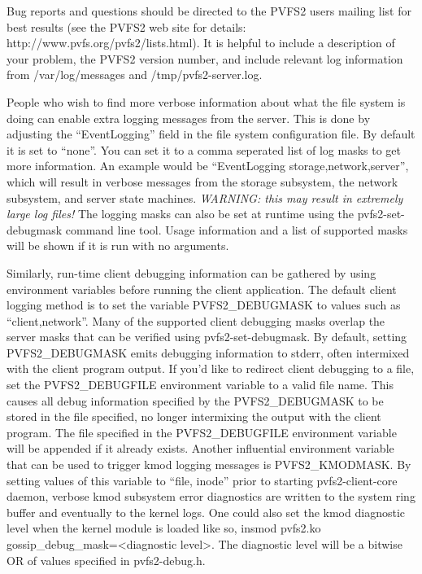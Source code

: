 \documentclass[11pt, letterpaper]{article}
\begin{document}
Bug reports and questions should be directed to the PVFS2 users
mailing list for best results (see the PVFS2 web site for details:
http://www.pvfs.org/pvfs2/lists.html).  It is helpful to include a
description of your problem, the PVFS2 version number, and include
relevant log information from /var/log/messages and
/tmp/pvfs2-server.log.

People who wish to find more verbose information about what the file
system is doing can enable extra logging messages from the server.
This is done by adjusting the ``EventLogging'' field in the file
system configuration file.  By default it is set to ``none''.  You can
set it to a comma seperated list of log masks to get more information.
An example would be ``EventLogging storage,network,server'', which
will result in verbose messages from the storage subsystem, the
network subsystem, and server state machines.  \emph{WARNING: this may
result in extremely large log files!}  The logging masks can also be
set at runtime using the pvfs2-set-debugmask command line tool.  Usage
information and a list of supported masks will be shown if it is run
with no arguments.

Similarly, run-time client debugging information can be gathered by
using environment variables before running the client application.
The default client logging method is to set the variable
PVFS2\_DEBUGMASK to values such as ``client,network''.  Many of the
supported client debugging masks overlap the server masks that can be
verified using pvfs2-set-debugmask.  By default, setting
PVFS2\_DEBUGMASK emits debugging information to stderr, often
intermixed with the client program output.  If you'd like to redirect
client debugging to a file, set the PVFS2\_DEBUGFILE environment
variable to a valid file name.  This causes all debug information
specified by the PVFS2\_DEBUGMASK to be stored in the file specified,
no longer intermixing the output with the client program.  The file
specified in the PVFS2\_DEBUGFILE environment variable will be
appended if it already exists. 
Another influential environment variable that can be used to trigger
kmod logging messages is PVFS2\_KMODMASK. By setting values of this variable
to ``file, inode'' prior to starting pvfs2-client-core daemon,
verbose kmod subsystem error diagnostics are written to the system ring buffer
and eventually to the kernel logs.
One could also set the kmod diagnostic level when the kernel module is loaded
like so, insmod pvfs2.ko gossip\_debug\_mask=<diagnostic level>.
The diagnostic level will be a bitwise OR of values specified in pvfs2-debug.h.
\end{document}
